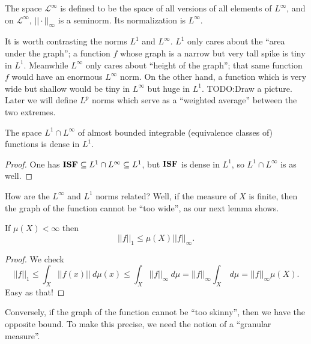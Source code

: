 \begin{subsec}
The space $\mathcal L^{\infty}$ is defined to be the space of all versions of all elements of $L^{\infty}$, and on $\mathcal L^{\infty}$, $||\cdot||_{\infty}$ is a seminorm. Its normalization is $L^{\infty}$.
\end{subsec}

\begin{subsec}
It is worth contrasting the norms $L^{1}$ and $L^{\infty}$. $L^{1}$ only cares about the ``area under the graph''; a function $f$ whose graph is a narrow but very tall spike is tiny in $L^{1}$. Meanwhile $L^{\infty}$ only cares about ``height of the graph''; that same function $f$ would have an enormous $L^{\infty}$ norm.
On the other hand, a function which is very wide but shallow would be tiny in $L^{\infty}$ but huge in $L^{1}$. TODO:\@ Draw a picture.
Later we will define $L^{p}$ norms which serve as a ``weighted average'' between the two extremes.
\end{subsec}

\begin{lemma}
The space $L^{1} \cap L^{\infty}$ of almost bounded integrable (equivalence classes of) functions is dense in $L^{1}$.
\end{lemma}
\begin{proof}
One has $\mathbf{ISF} \subseteq L^{1} \cap L^{\infty} \subseteq L^{1}$, but $\mathbf{ISF}$ is dense in $L^{1}$, so $L^{1} \cap L^{\infty}$ is as well.
\end{proof}

\begin{subsec}
How are the $L^{\infty}$ and $L^{1}$ norms related?
Well, if the measure of $X$ is finite, then the graph of the function cannot be ``too wide'', as our next lemma shows.
\end{subsec}

\begin{lemma}
If $\mu(X) < \infty$ then
\[||f||_{1} \leq \mu(X) ||f||_{\infty}.\]
\end{lemma}
\begin{proof}
We check
\[||f||_{1} \leq \int_{X} ||f(x)||~d\mu(x) \leq \int_{X} ||f||_{\infty} ~d\mu = ||f||_{\infty} \int_{X} ~d\mu = ||f||_{\infty} \mu(X).\]
Easy as that!
\end{proof}

\begin{subsec}
Conversely, if the graph of the function cannot be ``too skinny'', then we have the opposite bound.
To make this precise, we need the notion of a ``granular measure''.
\end{subsec}

